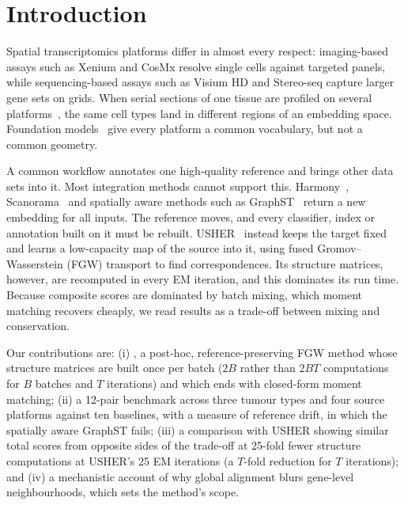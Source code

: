 \section{Introduction}\label{sec:intro}
Spatial transcriptomics platforms differ in almost every respect: imaging-based assays such as Xenium and CosMx
resolve single cells against targeted panels, while sequencing-based assays such as Visium HD and Stereo-seq capture
larger gene sets on grids. When serial sections of one tissue are profiled on several
platforms~\citep{ren2025spatch}, the same cell types land in different regions of an embedding space. Foundation
models~\citep{cui2024scgpt,wang2025scgptspatial,tejadalapuerta2025nicheformer} give every platform a common
vocabulary, but not a common geometry.

A common workflow annotates one high-quality reference and brings other data sets into it. Most integration
methods cannot support this. Harmony~\citep{korsunsky2019harmony}, Scanorama~\citep{hie2019scanorama} and spatially
aware methods such as GraphST~\citep{long2023graphst} return a new embedding for all inputs. The reference moves, and
every classifier, index or annotation built on it must be rebuilt. USHER~\citep{pratapa2025usher} instead keeps the
target fixed and learns a low-capacity map of the source into it, using fused Gromov--Wasserstein (FGW) transport to
find correspondences. Its structure matrices, however, are recomputed in every EM iteration, and this dominates its
run time. Because composite scores are dominated by batch mixing, which moment matching recovers cheaply, we read
results as a trade-off between mixing and conservation.

Our contributions are: (i) \frost, a post-hoc, reference-preserving FGW method whose structure matrices are built
once per batch ($2B$ rather than $2BT$ computations for $B$ batches and $T$ iterations) and which ends with
closed-form moment matching; (ii) a 12-pair benchmark across three tumour types and four source platforms against
ten baselines, with a measure of reference drift, in which the spatially aware GraphST fails; (iii) a comparison with USHER showing similar total scores from opposite sides of the trade-off at
25-fold fewer structure computations at USHER's 25 EM iterations (a $T$-fold reduction for $T$ iterations); and (iv) a mechanistic account of why global alignment blurs gene-level
neighbourhoods, which sets the method's scope.

